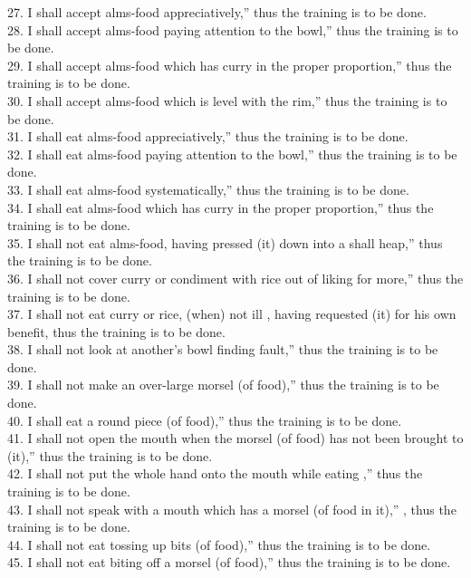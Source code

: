 \documentclass[12pt]{article}
\begin{document}
\begin{paracol}{2}
\begin{column}
{\begin{doublespace}
27. I shall accept alms-food appreciatively,” thus the training is to be done.\\
28. I shall accept alms-food paying attention to the bowl,” thus the training is to be done.\\
29. I shall accept alms-food which has curry in the proper proportion,” thus the training is to be done.\\
30. I shall accept alms-food which is level with the rim,” thus the training is to be done.\\
31. I shall eat alms-food appreciatively,” thus the training is to be done.\\
32. I shall eat alms-food paying attention to the bowl,” thus the training is to be done.\\
33. I shall eat alms-food systematically,” thus the training is to be done.\\
34. I shall eat alms-food which has curry in the proper proportion,” thus the training is to be done.\\
35. I shall not eat alms-food, having pressed (it) down into a shall heap,” thus the training is to be done.\\
36. I shall not cover curry or condiment with rice out of liking for more,” thus the training is to be done.\\
37. I shall not eat curry or rice, (when) not ill , having requested (it) for his own benefit, thus the training is to be done.\\
38. I shall not look at another's bowl finding fault,” thus the training is to be done.\\
39. I shall not make an over-large morsel (of food),” thus the training is to be done.\\
40. I shall eat a round piece (of food),” thus the training is to be done.\\
41. I shall not open the mouth when the morsel (of food) has not been brought to (it),” thus the training is to be done.\\
42. I shall not put the whole hand onto the mouth while eating ,” thus the training is to be done.\\
43. I shall not speak with a mouth which has a morsel (of food in it),” , thus the training is to be done.\\
44. I shall not eat tossing up bits (of food),” thus the training is to be done.\\
45. I shall not eat biting off a morsel (of food),” thus the training is to be done.\\

\end{doublespace}}
\end{column}
\end{paracol}
\end{document}
